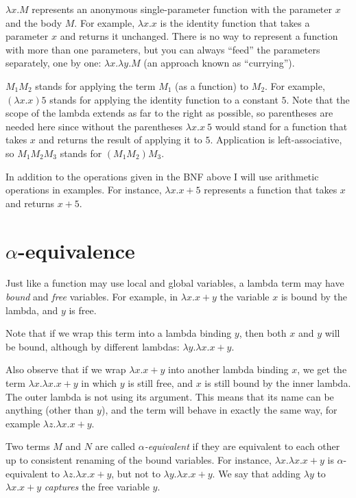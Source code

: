 \documentclass{article}
\newcommand{\lam}{\lambda}
\begin{document}
$\lam x. M$ represents an anonymous single-parameter function with the parameter $x$ and the body $M$. For example, $\lam x. x$ is the identity function that takes a parameter $x$ and returns it unchanged. There is no way to represent a function with more than one parameters, but you can always ``feed'' the parameters separately, one by one: $\lam x. \lam y. M$ (an approach known as ``currying'').

$M_1 M_2$ stands for applying the term $M_1$ (as  a function) to $M_2$. For example, $(\lam x. x) 5$ stands for applying the identity function to a constant $5$. Note that the scope of the lambda extends as far to the right as possible, so parentheses are needed here since without the parentheses   $\lam x. x~5$ would stand for a function that takes $x$ and returns the result of applying it to $5$. Application is left-associative, so $M_1 M_2M_3$ stands for $(M_1 M_2)M_3$. 

In addition to the operations given in the BNF above I will use arithmetic operations in examples. For instance, $\lam x. x + 5$ represents a function that takes $x$ and returns $x + 5$. 

\section{$\alpha$-equivalence}
Just like a function may use local and global variables, a lambda term may have \textit{bound} and \textit{free} variables. For example, in $\lam x.  x + y$ the variable $x$ is bound by the lambda, and $y$ is free. 

Note that if we wrap this term into a lambda binding $y$, then both $x$ and $y$ will be bound, although by different lambdas: $\lam y. \lam x.  x + y$. 

Also observe that if we wrap $\lam x.  x + y$ into another lambda binding $x$, we get the term $\lam x. \lam x.  x + y$ in which $y$ is still free, and $x$ is still bound by the inner lambda. The outer lambda is not using its argument. This means that its name can be anything (other than $y$), and the term will behave in exactly the same way, for example $\lam z. \lam x.  x + y$.

Two terms $M$ and $N$ are called \textit{$\alpha$-equivalent} if they are equivalent to each other up to consistent renaming of the bound variables. For instance, $\lam x. \lam x.  x + y$ is $\alpha$-equivalent to $\lam z. \lam x.  x + y$, but not to 
$\lam y. \lam x.  x + y$. We say that adding $\lam y$  to $\lam x.  x + y$ \textit{captures} the free variable $y$. 
\end{document}
